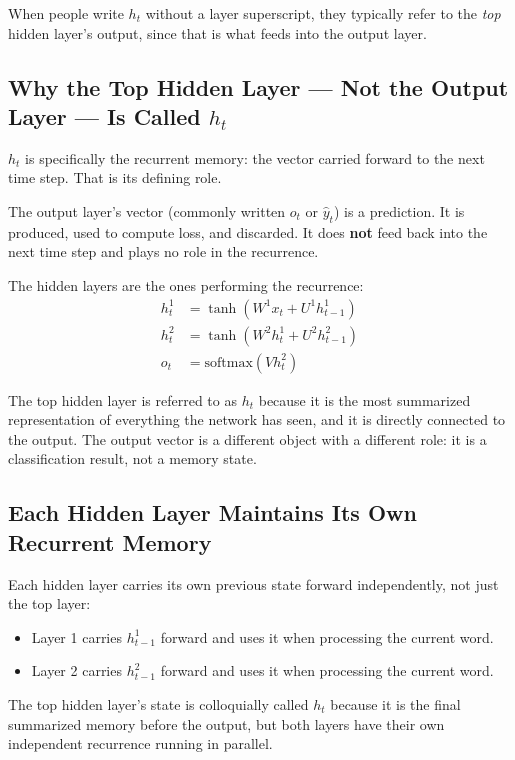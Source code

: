 When people write $h_t$ without a layer superscript, they typically refer to the \textit{top} hidden layer's output, since that is what feeds into the output layer.

\subsection{Why the Top Hidden Layer --- Not the Output Layer --- Is Called $h_t$}
$h_t$ is specifically the recurrent memory: the vector carried forward to the next time step. That is its defining role.

The output layer's vector (commonly written $o_t$ or $\hat{y}_t$) is a prediction. It is produced, used to compute loss, and discarded. It does \textbf{not} feed back into the next time step and plays no role in the recurrence.

The hidden layers are the ones performing the recurrence:
\begin{align*}
    h^1_t &= \tanh\!\left(W^1 x_t + U^1 h^1_{t-1}\right) \\
    h^2_t &= \tanh\!\left(W^2 h^1_t + U^2 h^2_{t-1}\right) \\
    o_t   &= \text{softmax}\!\left(V h^2_t\right)
\end{align*}

The top hidden layer is referred to as $h_t$ because it is the most summarized representation of everything the network has seen, and it is directly connected to the output. The output vector is a different object with a different role: it is a classification result, not a memory state.

\subsection{Each Hidden Layer Maintains Its Own Recurrent Memory}
Each hidden layer carries its own previous state forward independently, not just the top layer:
\begin{itemize}
    \item Layer 1 carries $h^1_{t-1}$ forward and uses it when processing the current word.
    \item Layer 2 carries $h^2_{t-1}$ forward and uses it when processing the current word.
\end{itemize}

The top hidden layer's state is colloquially called $h_t$ because it is the final summarized memory before the output, but both layers have their own independent recurrence running in parallel.

